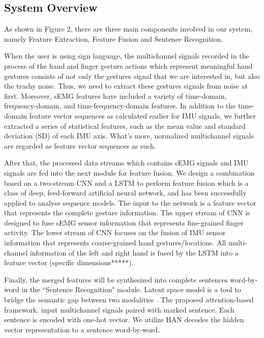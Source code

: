 \documentclass[10pt, conference, letterpaper]{IEEEtran}
\begin{document}
\subsection{System Overview}
As shown in Figure 2, there are three main components involved in our system, namely Feature Extraction, Feature Fusion and Sentence Recognition.

When the user is using sign language, the multichannel signals recorded in the process of the hand and finger gesture actions which represent meaningful hand gestures consists of not only the gestures signal that we are interested in, but also the trashy noise. Thus, we need to extract these gestures signals from noise at first. Moreover, sEMG features have included a variety of time-domain, frequency-domain, and time-frequency-domain features. In addition to the time-domain feature vector sequences as calculated earlier for IMU signals, we further extracted a series of statistical features, such as the mean value and standard deviation (SD) of each IMU axis. What's more, normalized multichannel signals are regarded as feature vector sequences as such.

After that, the processed data streams which contains sEMG signals and IMU signals are fed into the next module for feature fusion. We design a combination based on a two-stream CNN and a LSTM to perform feature fusion which is a class of deep, feed-forward artificial neural network, and has been successfully applied to analyse sequence models. The input to the network is a feature vector that represents the complete gesture information. The upper stream of CNN is designed to fuse sEMG sensor information that represents fine-grained finger activity. The lower stream of CNN focuses on the fusion of IMU sensor information that represents coarse-grained hand gestures/locations. All multi-channel information of the left and right hand is fused by the LSTM into a feature vector (specific dimensions*****).

Finally, the merged features will be synthesized into complete sentences word-by-word in the ``Sentence Recognition" module. Latent space model is a tool to bridge the semantic gap between two modalities \cite{zhang2015auxiliary,zhang2015multi,zhang2014can}. The proposed attention-based framework. input multichannel signals paired with marked sentence. Each sentence is encoded with one-hot vector. We utilize HAN decodes the hidden vector representation to a sentence word-by-word.
\end{document}
